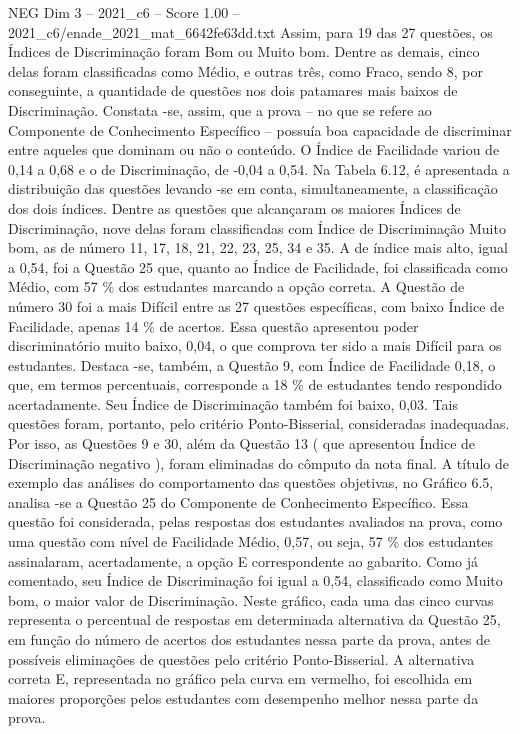 \begin{textsample}{NEG Dim 3 – 2021\_c6 – Score 1.00 – 2021\_c6/enade\_2021\_mat\_6642fe63dd.txt}
Assim, para 19 das 27 questões, os Índices de Discriminação foram Bom ou Muito bom.
Dentre as demais, cinco delas foram classificadas como Médio, e outras três, como Fraco, sendo 8, por conseguinte, a quantidade de questões nos dois patamares mais baixos de Discriminação.
Constata -se, assim, que a prova – no que se refere ao Componente de Conhecimento Específico – possuía boa capacidade de discriminar entre aqueles que dominam ou não o conteúdo.
O Índice de Facilidade variou de 0,14 a 0,68 e o de Discriminação, de -0,04 a 0,54.
Na Tabela 6.12, é apresentada a distribuição das questões levando -se em conta, simultaneamente, a classificação dos dois índices.
Dentre as questões que alcançaram os maiores Índices de Discriminação, nove delas foram classificadas com Índice de Discriminação Muito bom, as de número 11, 17, 18, 21, 22, 23, 25, 34 e 35.
A de índice mais alto, igual a 0,54, foi a Questão 25 que, quanto ao Índice de Facilidade, foi classificada como Médio, com 57 \% dos estudantes marcando a opção correta.
A Questão de número 30 foi a mais Difícil entre as 27 questões específicas, com baixo Índice de Facilidade, apenas 14 \% de acertos.
Essa questão apresentou poder discriminatório muito baixo, 0,04, o que comprova ter sido a mais Difícil para os estudantes.
Destaca -se, também, a Questão 9, com Índice de Facilidade 0,18, o que, em termos percentuais, corresponde a 18 \% de estudantes tendo respondido acertadamente.
Seu Índice de Discriminação também foi baixo, 0,03.
Tais questões foram, portanto, pelo critério Ponto-Bisserial, consideradas inadequadas.
Por isso, as Questões 9 e 30, além da Questão 13 ( que apresentou Índice de Discriminação negativo ), foram eliminadas do cômputo da nota final.
A título de exemplo das análises do comportamento das questões objetivas, no Gráfico 6.5, analisa -se a Questão 25 do Componente de Conhecimento Específico.
Essa questão foi considerada, pelas respostas dos estudantes avaliados na prova, como uma questão com nível de Facilidade Médio, 0,57, ou seja, 57 \% dos estudantes assinalaram, acertadamente, a opção E correspondente ao gabarito.
Como já comentado, seu Índice de Discriminação foi igual a 0,54, classificado como Muito bom, o maior valor de Discriminação.
Neste gráfico, cada uma das cinco curvas representa o percentual de respostas em determinada alternativa da Questão 25, em função do número de acertos dos estudantes nessa parte da prova, antes de possíveis eliminações de questões pelo critério Ponto-Bisserial.
A alternativa correta E, representada no gráfico pela curva em vermelho, foi escolhida em maiores proporções pelos estudantes com desempenho melhor nessa parte da prova.

\end{textsample}
